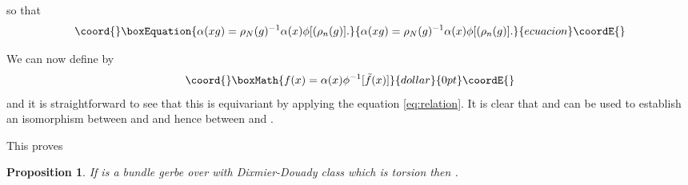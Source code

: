 \documentclass[a4paper,reqno]{amsart}
\DeclareMathOperator{\Fred}{Fred}
\theoremstyle{plain}
\newtheorem{proposition}[theorem]{Proposition}
\theoremstyle{definition}
\theoremstyle{remark}
\numberwithin{equation}{section}
\numberwithin{figure}{section}
\providecommand{\CC}{{\mathbb C}}
\providecommand{\<}{\langle}
\renewcommand{\>}{\rangle}
\begin{document}
so that
\begin{equation}\coord{}\boxEquation{
\label{eq:relation}
\alpha(xg) = \rho_N(g)^{-1} \alpha(x) \phi[(\rho_n(g)].
}{
\alpha(xg) = \rho_N(g)^{-1} \alpha(x) \phi[(\rho_n(g)].
}{ecuacion}\coordE{}\end{equation}

We can now define \myHighlight{$ f \colon X \to \Fred(\CC^n \otimes X)$}\coordHE{} by
$$\coord{}\boxMath{
f(x)  =     \alpha(x)\phi^{-1}[ \tilde f(x) ]
}{dollar}{0pt}\coordE{}$$
and it is straightforward to see that this is \coordHE{} equivariant
by applying the equation \eqref{eq:relation}.  It is clear that
\coordHE{} and \myHighlight{$\phi$}\coordHE{} can be used to
establish an isomorphism between \coordHE{}
and \coordHE{} and hence between \coordHE{} and \coordHE{}.

This proves
\begin{proposition} If \coordHE{} is a bundle gerbe over \coordHE{} with
Dixmier-Douady class \myHighlight{$[H]$}\coordHE{}
which is torsion then
\coordHE{}.
\end{proposition}
\end{document}
